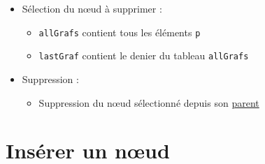 \begin{itemize}
\tightlist
\item
  Sélection du nœud à supprimer :

  \begin{itemize}
  \tightlist
  \item
    \textenglish{\texttt{allGrafs}} contient tous les éléments
    \textenglish{\texttt{p}}
  \item
    \textenglish{\texttt{lastGraf}} contient le denier du tableau
    \textenglish{\texttt{allGrafs}}
  \end{itemize}
\item
  Suppression :

  \begin{itemize}
  \tightlist
  \item
    Suppression du nœud sélectionné depuis son
    \href{https://developer.mozilla.org/en-US/docs/Web/API/Node/parentNode}{parent}
  \end{itemize}
\end{itemize}

\hypertarget{insuxe9rer-un-nux153ud}{%
\section{Insérer un nœud}\label{insuxe9rer-un-nux153ud}}

\begin{english}

\begin{Shaded}
\begin{Highlighting}[]
 \NormalTok{() \{}
     \OperatorTok{=} \NormalTok{(}\NormalTok{)}\OperatorTok{;}
     \OperatorTok{=} \NormalTok{(}\NormalTok{)}\OperatorTok{;}
\OperatorTok{;}
    
     \OperatorTok{=} \NormalTok{(}\NormalTok{)[}\NormalTok{]}\OperatorTok{;}
     \OperatorTok{=}\NormalTok{(}\NormalTok{)}\OperatorTok{;}
     \OperatorTok{=}\NormalTok{(}\NormalTok{)}\OperatorTok{;}             

\OperatorTok{,}\OperatorTok{;}
\NormalTok{\}}
\end{Highlighting}
\end{Shaded}

\end{english}

